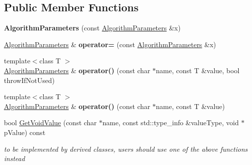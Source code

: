 \subsection*{Public Member Functions}
\begin{DoxyCompactItemize}
\item 
\hypertarget{class_algorithm_parameters_a4f1fbf31702f1eafe9736905da393aa0}{
{\bfseries AlgorithmParameters} (const \hyperlink{class_algorithm_parameters}{AlgorithmParameters} \&x)}
\label{class_algorithm_parameters_a4f1fbf31702f1eafe9736905da393aa0}

\item 
\hypertarget{class_algorithm_parameters_a3dce6b7beda012c28f2c1ab6c4131a69}{
\hyperlink{class_algorithm_parameters}{AlgorithmParameters} \& {\bfseries operator=} (const \hyperlink{class_algorithm_parameters}{AlgorithmParameters} \&x)}
\label{class_algorithm_parameters_a3dce6b7beda012c28f2c1ab6c4131a69}

\item 
\hypertarget{class_algorithm_parameters_a76d90643520e60a15ac4379bacc9d42d}{
{\footnotesize template$<$class T $>$ }\\\hyperlink{class_algorithm_parameters}{AlgorithmParameters} \& {\bfseries operator()} (const char $\ast$name, const T \&value, bool throwIfNotUsed)}
\label{class_algorithm_parameters_a76d90643520e60a15ac4379bacc9d42d}

\item 
\hypertarget{class_algorithm_parameters_a3c087b823ddb95802bdd134636a84551}{
{\footnotesize template$<$class T $>$ }\\\hyperlink{class_algorithm_parameters}{AlgorithmParameters} \& {\bfseries operator()} (const char $\ast$name, const T \&value)}
\label{class_algorithm_parameters_a3c087b823ddb95802bdd134636a84551}

\item 
\hypertarget{class_algorithm_parameters_aa87f0bd2bce0ab8a04c2773f3cbc5f71}{
bool \hyperlink{class_algorithm_parameters_aa87f0bd2bce0ab8a04c2773f3cbc5f71}{GetVoidValue} (const char $\ast$name, const std::type\_\-info \&valueType, void $\ast$pValue) const }
\label{class_algorithm_parameters_aa87f0bd2bce0ab8a04c2773f3cbc5f71}

\begin{DoxyCompactList}\small\item\em to be implemented by derived classes, users should use one of the above functions instead \item\end{DoxyCompactList}\end{DoxyCompactItemize}
